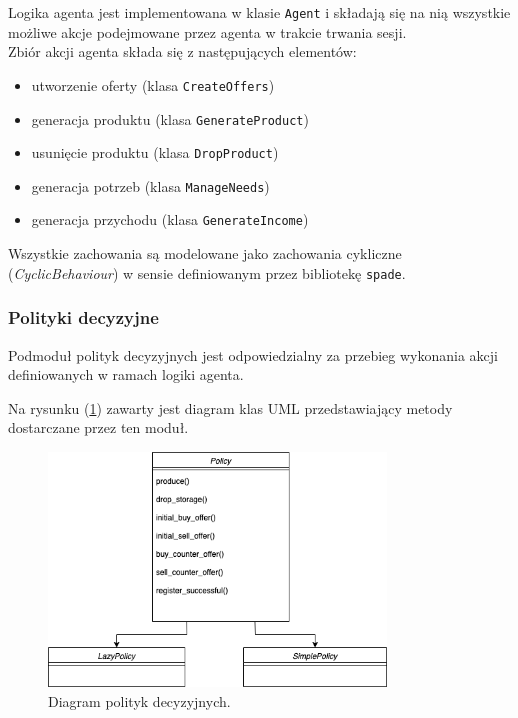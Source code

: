 \documentclass{article}
\begin{document}
Logika agenta jest implementowana w klasie \texttt{Agent} i składają się na nią wszystkie możliwe akcje podejmowane przez agenta w trakcie trwania sesji. \\
Zbiór akcji agenta składa się z następujących elementów:

\begin{itemize}

	\item utworzenie oferty (klasa \texttt{CreateOffers})
	\item generacja produktu (klasa \texttt{GenerateProduct})
	\item usunięcie produktu (klasa \texttt{DropProduct}) 
	\item generacja potrzeb (klasa \texttt{ManageNeeds})
	\item generacja przychodu (klasa \texttt{GenerateIncome})
\end{itemize}

Wszystkie zachowania są modelowane jako zachowania cykliczne (\textit{CyclicBehaviour}) w sensie definiowanym przez bibliotekę \texttt{spade}.

\subsubsection{Polityki decyzyjne}

Podmoduł polityk decyzyjnych jest odpowiedzialny za przebieg wykonania akcji definiowanych w ramach logiki agenta.

Na rysunku (\ref{fig:uml-policy}) zawarty jest diagram 
klas UML przedstawiający metody dostarczane przez ten moduł.

\begin{figure}[H]
	\centering
	\includegraphics[width=0.8\textwidth, height=0.3\textheight]{./png/policy.png}
	\caption{Diagram polityk decyzyjnych.}
	\label{fig:uml-policy}
\end{figure}
\end{document}
